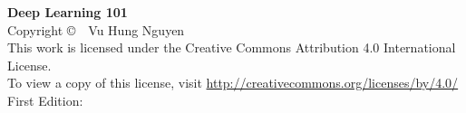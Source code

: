 \documentclass[10pt,\papersize,twoside,openright]{book}
\begin{document}
\newpage
\thispagestyle{empty}
\vspace*{\fill}
\begin{flushleft}
\textbf{Deep Learning 101}\\
Copyright \copyright~\the\year~Vu Hung Nguyen\\[0.5em]
This work is licensed under the Creative Commons Attribution 4.0 International License.\\
To view a copy of this license, visit \url{http://creativecommons.org/licenses/by/4.0/}\\[0.5em]
First Edition: \DTMtoday
\end{flushleft}
\vspace*{\fill}
\clearpage

\newpage
\thispagestyle{empty}
\vspace*{\fill}
\end{document}
